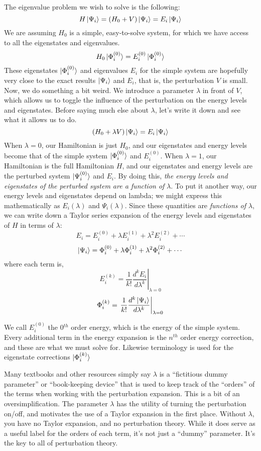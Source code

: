 \documentclass{article}
\newcommand{\lam}{\lambda}
\begin{document}
The eigenvalue problem we wish to solve is the following:
\[H \ket{\Psi_i} = (H_0 + V) \ket{\Psi_i} = E_i \ket{\Psi_i}\]
We are assuming $H_0$ is a simple, easy-to-solve system, for which we have access to all the eigenstates 
    and eigenvalues.
\[H_0 \ket{\Phi_i^{(0)}} = E_i^{(0)} \ket{\Phi_i^{(0)}} \]
These eigenstates $\ket{\Phi_i^{(0)}}$ and eigenvalues $E_i$ for the simple system are hopefully very close
    to the exact results  $\ket{\Psi_i}$ and  $E_i$, that is, the perturbation $V$ is small.
Now, we do something a bit weird.
We introduce a parameter $\lam$ in front of $V$, which allows us to toggle the influence of the
    perturbation on the energy levels and eigenstates. 
Before saying much else about $\lam$, let's write it down and see what it allows us to do.
\[(H_0 +  \lam V) \ket{\Psi_i} = E_i \ket{\Psi_i}\]
When $\lam = 0$, our Hamiltonian is just $H_0$, and our eigenstates and energy levels become that 
    of the simple system $\ket{\Phi_i^{(0)}}$ and $ E_i^{(0)}$.
When $\lam = 1$, our Hamiltonian is the full Hamiltonian $H$, and our eigenstates and energy levels 
    are the perturbed system $\ket{\Psi_i^{(0)}}$ and $E_i$.
By doing this, \textit{the energy levels and eigenstates of the perturbed system are a function
    of }$\lam$.
To put it another way, our energy levels and eigenstates depend on lambda; 
    we might express this mathematically as  $E_i(\lam)$ and $\Psi_i(\lam)$.
Since these quantities are \textit{functions of} $\lam$, we can write down a Taylor series
expansion of the energy levels and eigenstates of $H$ in terms of $\lam$:
\[E_i =  E_i^{(0)} +  \lam E_i^{(1)} + \lam^2 E_i^{(2)}  + \cdots \]
\[\ket{\Psi_i} =  \Phi_i^{(0)} +  \lam \Phi_i^{(1)} + \lam^2 \Phi_i^{(2)} + \cdots \]
where each term is,  
\[ E_i^{(k)} = \left. \frac{1}{k!} \frac{d^k E_i}{d \lam^k} \right\rvert_{\lam = 0} \]
\[ \Phi_i^{(k)} = \left. \frac{1}{k!} \frac{d^k \ket{\Psi_i}}{d \lam^k} \right\rvert_{\lam = 0} \]

We call $E_i^{(0)}$ the 0$^{th}$ order energy, which is the energy of the simple system. 
Every additional term in the energy expansion is the $n^{th}$ order energy correction, 
    and these are what we must solve for.
Likewise terminology is used for the eigenstate corrections $\ket{\Phi_i^{(k)}}$

Many textbooks and other resources simply say $\lam$ is a 
    ``fictitious dummy parameter'' or ``book-keeping device'' that is 
    used to keep track of the  ``orders'' of the terms when working with the perturbation expansion.
This is a bit of an oversimplification. The parameter $\lam$ has the utility of turning
the perturbation on/off, and motivates the use of a Taylor expansion in the first place.
Without $\lam$, you have no Taylor expansion, and no perturbation theory. 
While it does serve as a useful label for the orders of each term, it's not just a ``dummy'' parameter. 
It's the key to all of perturbation theory.
\end{document}
